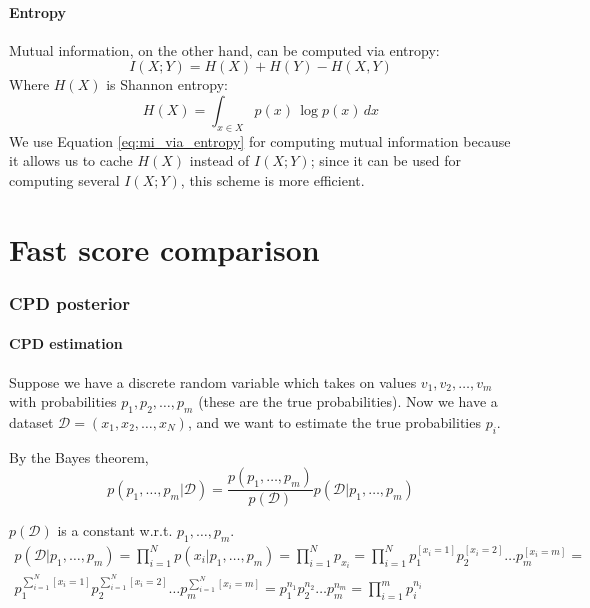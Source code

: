 \documentclass{article}
\begin{document}
\paragraph{Entropy} 
Mutual information, on the other hand, can be computed via entropy:
\begin{equation}
\label{eq:mi_via_entropy}
I(X; Y) = H(X) + H(Y) - H(X, Y)
\end{equation}
Where $H(X)$ is Shannon entropy:
\begin{equation}
H(X) = \int_{x \in X}{p(x)\,\log p(x)\,dx}
\end{equation}
We use Equation \ref{eq:mi_via_entropy} for computing mutual information because it allows us to cache $H(X)$ instead of $I(X; Y)$; since it can be used for computing several $I(X; Y)$, this scheme is more efficient.

\section{Fast score comparison}
\subsubsection{CPD posterior}
\paragraph{CPD estimation} Suppose we have a discrete random variable which takes on values $v_1, v_2, \ldots, v_m$ with probabilities $p_1, p_2, \ldots, p_m$ (these are the true probabilities). Now we have a dataset $\mathcal{D} = (x_1, x_2, \ldots, x_N)$, and we want to estimate the true probabilities $p_i$.

By the Bayes theorem,
\begin{equation}
p(p_1, \ldots, p_m | \mathcal{D}) = \frac{p(p_1, \ldots, p_m)}{p(\mathcal{D})} p(\mathcal{D} | p_1, \ldots, p_m) 
\end{equation}

$p(\mathcal{D})$ is a constant w.r.t. $p_1, \ldots, p_m$.
\begin{multline}
p(\mathcal{D}|p_1, \ldots, p_m) = \prod_{i=1}^{N}{p(x_i|p_1, \ldots, p_m)} = \prod_{i=1}^{N}{p_{x_i}} = \prod_{i=1}^{N}{p_1^{[x_i = 1]} p_2^{[x_i = 2]} \ldots p_m^{[x_i = m]}} = \\ p_1^{\sum_{i=1}^N{[x_i = 1]}} p_2^{\sum_{i=1}^N{[x_i = 2]}} \ldots p_m^{\sum_{i=1}^N{[x_i = m]}} = p_1^{n_1} p_2^{n_2} \ldots p_m^{n_m} = \prod_{i = 1}^m{p_i^{n_i}}
\end{multline}
\end{document}
